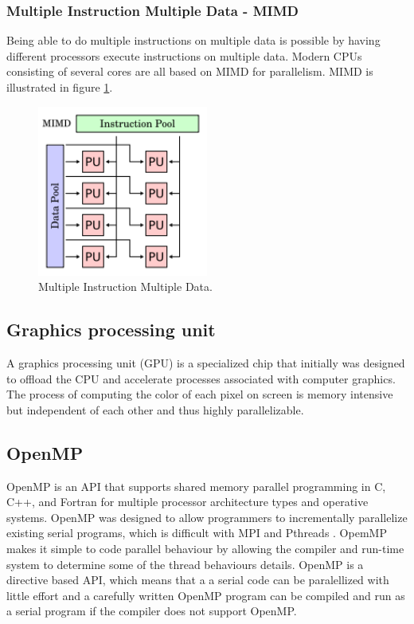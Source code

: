 \subsubsection*{Multiple Instruction Multiple Data - MIMD}
Being able to do multiple instructions on multiple data is possible by having different processors execute instructions on multiple data. Modern CPUs consisting of several cores are all based on MIMD for parallelism. MIMD is illustrated in figure \ref{MIMD}.
\begin{figure}[h!]
\centering
\includegraphics[width=0.50\textwidth]{backgroundTheory/parallel/MIMD}
\caption{Multiple Instruction Multiple Data.}
\label{MIMD}
\end{figure}

\subsection{Graphics processing unit}
A graphics processing unit (GPU) is a specialized chip that initially was designed to offload the CPU and accelerate processes associated with computer graphics. The process of computing the color of each pixel on screen is memory intensive but independent of each other and thus highly parallelizable. 

\subsection{OpenMP}
OpenMP is an API that supports shared memory parallel programming in C, C++, and Fortran for multiple processor architecture types and operative systems. OpenMP was designed to allow programmers to incrementally parallelize existing serial programs, which is difficult with MPI and Pthreads \cite{peter11}. OpemMP makes it simple to code parallel behaviour by allowing the compiler and run-time system to determine some of the thread behaviours details. OpenMP is a directive based API, which means that a a serial code can be paralellized with little effort and a carefully written OpenMP program can be compiled and run as a serial program if the compiler does not support OpenMP. 

